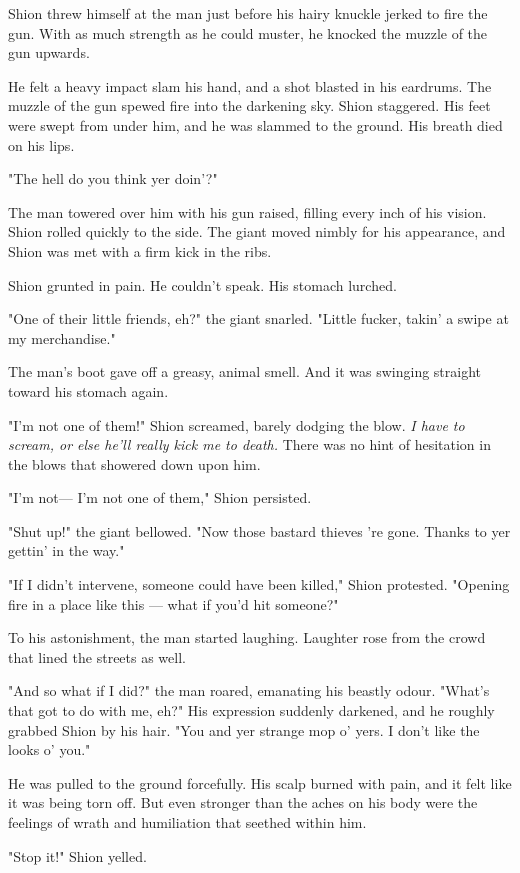 Shion threw himself at the man just before his hairy knuckle jerked to
fire the gun. With as much strength as he could muster, he knocked the
muzzle of the gun upwards.

He felt a heavy impact slam his hand, and a shot blasted in his
eardrums. The muzzle of the gun spewed fire into the darkening sky.
Shion staggered. His feet were swept from under him, and he was slammed
to the ground. His breath died on his lips.

"The hell do you think yer doin'?"

The man towered over him with his gun raised, filling every inch of his
vision. Shion rolled quickly to the side. The giant moved nimbly for his
appearance, and Shion was met with a firm kick in the ribs.

Shion grunted in pain. He couldn't speak. His stomach lurched.

"One of their little friends, eh?" the giant snarled. "Little fucker,
takin' a swipe at my merchandise."

The man's boot gave off a greasy, animal smell. And it was swinging
straight toward his stomach again.

"I'm not one of them!" Shion screamed, barely dodging the blow.\emph{ I have
to scream, or else he'll really kick me to death.} There was no hint of
hesitation in the blows that showered down upon him.

"I'm not--- I'm not one of them," Shion persisted.

"Shut up!" the giant bellowed. "Now those bastard thieves 're gone.
Thanks to yer gettin' in the way."

"If I didn't intervene, someone could have been killed," Shion
protested. "Opening fire in a place like this --- what if you'd hit
someone?"

To his astonishment, the man started laughing. Laughter rose from the
crowd that lined the streets as well.

"And so what if I did?" the man roared, emanating his beastly odour.
"What's that got to do with me, eh?" His expression suddenly darkened,
and he roughly grabbed Shion by his hair. "You and yer strange mop o'
yers. I don't like the looks o' you."

He was pulled to the ground forcefully. His scalp burned with pain, and
it felt like it was being torn off. But even stronger than the aches on
his body were the feelings of wrath and humiliation that seethed within
him.

"Stop it!" Shion yelled.

